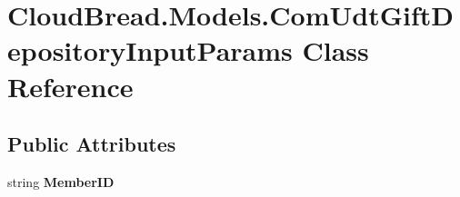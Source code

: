 \hypertarget{a00068}{}\section{Cloud\+Bread.\+Models.\+Com\+Udt\+Gift\+Depository\+Input\+Params Class Reference}
\label{a00068}
\subsection*{Public Attributes}
\begin{DoxyCompactItemize}
\item 
string {\bfseries Member\+ID}\hypertarget{a00068_ad8a70062a867787f618f4a0f7c3b3495}{}\label{a00068_ad8a70062a867787f618f4a0f7c3b3495}

\end{DoxyCompactItemize}
